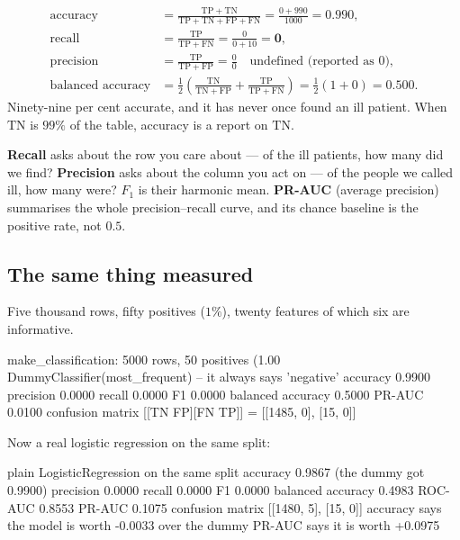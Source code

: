 \documentclass[11pt]{article}
\begin{document}
\begin{worked}
\begin{align*}
  \text{accuracy}  &= \frac{\mathrm{TP} + \mathrm{TN}}
     {\mathrm{TP}+\mathrm{TN}+\mathrm{FP}+\mathrm{FN}}
     = \frac{0 + 990}{1000} = \mathbf{0.990},\\
  \text{recall}    &= \frac{\mathrm{TP}}{\mathrm{TP}+\mathrm{FN}}
     = \frac{0}{0+10} = \mathbf{0},\\
  \text{precision} &= \frac{\mathrm{TP}}{\mathrm{TP}+\mathrm{FP}}
     = \frac{0}{0} \quad \text{undefined (reported as 0)},\\
  \text{balanced accuracy} &= \tfrac12\!\left(\frac{\mathrm{TN}}
     {\mathrm{TN}+\mathrm{FP}} + \frac{\mathrm{TP}}{\mathrm{TP}+\mathrm{FN}}
     \right) = \tfrac12(1 + 0) = \mathbf{0.500}.
\end{align*}
Ninety-nine per cent accurate, and it has never once found an ill patient.
When $\mathrm{TN}$ is $99\%$ of the table, accuracy is a report on
$\mathrm{TN}$.
\end{worked}

\begin{keyidea}
\textbf{Recall} asks about the row you care about --- of the ill patients, how
many did we find? \textbf{Precision} asks about the column you act on --- of
the people we called ill, how many were? $F_1$ is their harmonic mean.
\textbf{PR-AUC} (average precision) summarises the whole precision--recall
curve, and its chance baseline is the positive rate, not $0.5$.
\end{keyidea}

\subsection{The same thing measured}

Five thousand rows, fifty positives ($1\%$), twenty features of which six are
informative.

\begin{codeout}
make_classification: 5000 rows, 50 positives (1.00%
   DummyClassifier(most_frequent) -- it always says 'negative'
      accuracy  0.9900
      precision 0.0000   recall 0.0000   F1 0.0000
      balanced accuracy 0.5000   PR-AUC 0.0100
      confusion matrix [[TN FP][FN TP]] = [[1485, 0], [15, 0]]
\end{codeout}

Now a real logistic regression on the same split:

\begin{codeout}
   plain LogisticRegression on the same split
      accuracy  0.9867  (the dummy got 0.9900)
      precision 0.0000   recall 0.0000   F1 0.0000
      balanced accuracy 0.4983   ROC-AUC 0.8553   PR-AUC 0.1075
      confusion matrix [[1480, 5], [15, 0]]
   accuracy says the model is worth -0.0033 over the dummy
   PR-AUC says it is worth +0.0975
\end{codeout}
\end{document}

